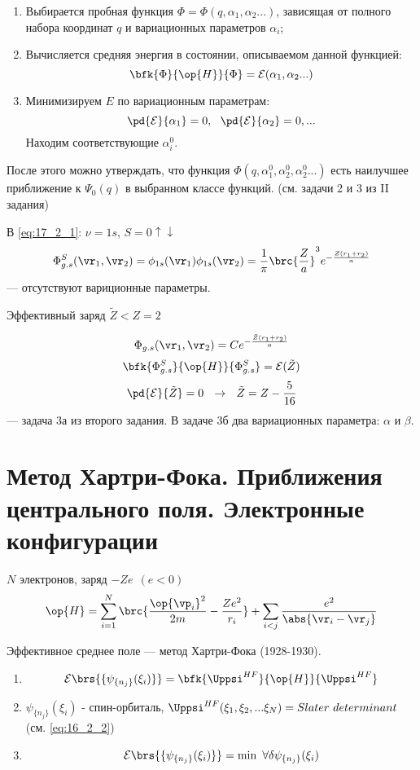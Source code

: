 \begin{enumerate}
\item Выбирается пробная функция $\Phi = \Phi(q, \alpha_1, \alpha_2 ... )$, зависящая от полного набора координат $q$ и вариационных параметров $\alpha_i$;
\item Вычисляется средняя энергия в состоянии, описываемом данной функцией:
$$
\bfk{\Phi}{\op{H}}{\Phi} = \mathcal{E}(\alpha_1, \alpha_2 ...)
$$
\item Минимизируем $E$ по вариационным параметрам:
$$
\pd{\mathcal{E}}{\alpha_1} = 0,~~ \pd{\mathcal{E}}{\alpha_2} = 0, ... 
$$
Находим соответствующие $\alpha_i^0$.
\end{enumerate}
После этого можно утверждать, что функция $\Phi(q, \alpha_1^0, \alpha_2^0, \alpha_2^0 ...)$ есть наилучшее приближение к $\Psi_0(q)$ в выбранном классе функций. (см. задачи 2 и 3 из II задания)

В \eqref{eq:17_2_1}: $\nu = 1s$, $S = 0 \uparrow \downarrow$
\begin{equation}
\label{eq:18_1_5}
\Phi_{g.s}^{S}(\vr_1, \vr_2) = \phi_{1s}(\vr_1)\phi_{1s}(\vr_2) = \frac{1}{\pi} \brc{\frac{Z}{a}}^3 e^{-\frac{Z(r_1 + r_2)}{a}}
\end{equation}
--- отсутствуют вариционные параметры.

Эффективный заряд $\tilde{Z} < Z = 2$

\begin{equation}
\label{eq:18_1_6}
\Phi_{g.s}(\vr_1, \vr_2) = C e^{-\frac{\tilde{Z}(r_1 + r_2)}{a}}
\end{equation}
$$
\bfk{\Phi_{g.s}^{S}}{\op{H}}{\Phi_{g.s}^{S}} = \mathcal{E}(\tilde{Z})
$$
$$
\pd{\mathcal{E}}{\tilde{Z}} = 0 ~~\to~~ \tilde{Z} = Z - \frac{5}{16}
$$
--- задача 3а из второго задания. В задаче 3б два вариационных параметра: $\alpha$ и $\beta$.

\section{Метод Хартри-Фока. Приближения центрального поля. Электронные конфигурации}
$N$ электронов, заряд $-Ze~~ (e<0)$
\begin{equation}
\label{eq:18_2_1}
\op{H} = \sum_{i=1}^{N} \brc{\frac{\op{\vp_i}^2}{2m} - \frac{Ze^2}{r_i}} + \sum_{i<j} \frac{e^2}{\abs{\vr_i - \vr_j}}
\end{equation}

Эффективное среднее поле --- метод Хартри-Фока (1928-1930).

\begin{enumerate}
\item \begin{equation}
\label{eq:18_2_2}
\mathcal{E}\brs{\{\psi_{\{n_j\}}(\xi_i)\}} = \bfk{\Uppsi^{HF}}{\op{H}}{\Uppsi^{HF}}
\end{equation}

\item $\psi_{\{n_j\}}(\xi_i)$ - спин-орбиталь,  $\Uppsi^{HF}(\xi_1, \xi_2, ... \xi_N) = Slater~determinant$ (см. \eqref{eq:16_2_2})

\item 
$$
\mathcal{E}\brs{\{\psi_{\{n_j\}}(\xi_i)\}} = \min~ \forall \delta\psi_{\{n_j\}}(\xi_i)
$$
\end{enumerate}

